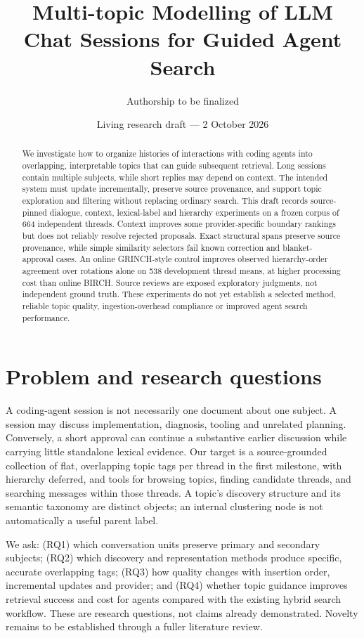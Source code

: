 \documentclass[11pt]{article}
\title{Multi-topic Modelling of LLM Chat Sessions for Guided Agent Search}
\author{Authorship to be finalized}
\date{Living research draft --- 2 October 2026}
\begin{document}
\maketitle
\begin{abstract}
We investigate how to organize histories of interactions with coding agents into
overlapping, interpretable topics that can guide subsequent retrieval. Long
sessions contain multiple subjects, while short replies may depend on context.
The intended system must update incrementally, preserve source provenance, and
support topic exploration and filtering without replacing ordinary search.
This draft records source-pinned dialogue, context, lexical-label and hierarchy
experiments on a frozen corpus of 664 independent threads. Context improves
some provider-specific boundary rankings but does not reliably resolve rejected
proposals. Exact structural spans preserve source provenance, while simple
similarity selectors fail known correction and blanket-approval cases. An online
GRINCH-style control improves observed hierarchy-order agreement over rotations
alone on 538 development thread means, at higher processing cost than online
BIRCH. Source reviews are exposed exploratory judgments, not independent ground
truth. These experiments do not yet establish a selected method, reliable topic
quality, ingestion-overhead compliance or improved agent search performance.
\end{abstract}

\section{Problem and research questions}
A coding-agent session is not necessarily one document about one subject. A
session may discuss implementation, diagnosis, tooling and unrelated planning.
Conversely, a short approval can continue a substantive earlier discussion while
carrying little standalone lexical evidence. Our target is a source-grounded
collection of flat, overlapping topic tags per thread in the first milestone,
with hierarchy deferred, and
tools for browsing topics, finding candidate threads, and searching messages
within those threads. A topic's discovery structure and its semantic taxonomy
are distinct objects; an internal clustering node is not automatically a useful
parent label.

We ask: (RQ1) which conversation units preserve primary and secondary subjects;
(RQ2) which discovery and representation methods produce specific, accurate
overlapping tags; (RQ3) how quality changes with insertion order, incremental
updates and provider; and (RQ4) whether topic guidance improves retrieval success
and cost for agents compared with the existing hybrid search workflow. These
are research questions, not claims already demonstrated. Novelty remains to be
established through a fuller literature review.
\end{document}
